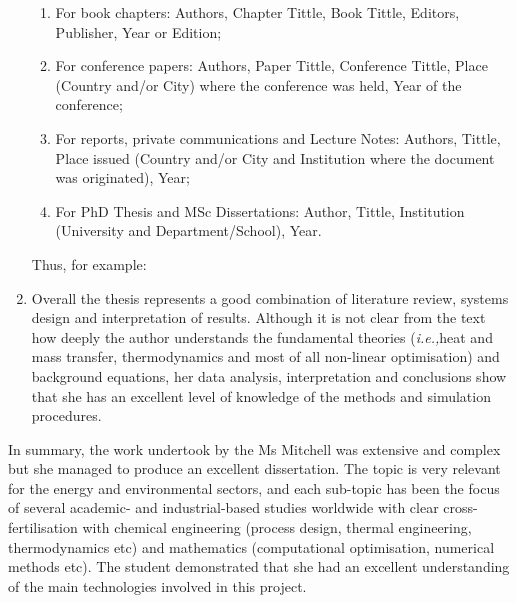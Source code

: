 \documentclass[14pt,twoside]{report}
\newcommand{\ie}{{\it i.e.,}}
\begin{document}
\begin{enumerate}
\begin{enumerate}
\item For book chapters: Authors, Chapter Tittle, Book Tittle, Editors, Publisher, Year or Edition;
\item For conference papers: Authors, Paper Tittle, Conference Tittle, Place (Country and/or City) where the conference was held, Year of the conference;
\item For reports, private communications and Lecture Notes: Authors, Tittle, Place issued (Country and/or City and Institution where the document was originated), Year;
\item For PhD Thesis and MSc Dissertations: Author, Tittle, Institution (University and Department/School), Year.
\end{enumerate}  
Thus, for example:
%
\item Overall the thesis represents a good combination of literature review, systems design and interpretation of results. Although it is not clear from the text how deeply the author understands the fundamental theories (\ie heat and mass transfer, thermodynamics and most of all non-linear optimisation) and background equations, her data analysis, interpretation and conclusions show that she has an excellent level of knowledge of the methods and simulation procedures.
%
\end{enumerate}
In summary, the work undertook by the Ms Mitchell was extensive and complex but she managed to produce an excellent dissertation. The topic is very relevant for the energy and environmental sectors, and each sub-topic has been the focus of several academic- and industrial-based studies worldwide with clear cross-fertilisation with chemical engineering (process design, thermal engineering, thermodynamics etc) and mathematics (computational optimisation, numerical methods etc). The student demonstrated that she had an excellent understanding of the main technologies involved in this project.
\end{document}
